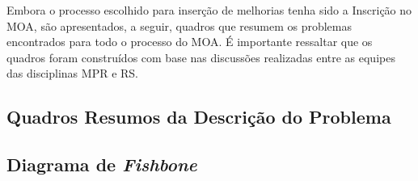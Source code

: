 Embora o processo escolhido para inserção de melhorias tenha sido a Inscrição no MOA, são apresentados, a seguir, quadros que resumem os problemas encontrados para todo o processo do MOA. É importante ressaltar que os quadros foram construídos com base nas discussões realizadas entre as equipes das disciplinas MPR e RS.

\subsection[Quadros Resumos da Descrição do Problema]{Quadros Resumos da Descrição do Problema}
\label{subsec:contexto_problema_quadros}
	

\subsection[Diagrama de \emph{Fishbone}]{Diagrama de \emph{Fishbone}}
	\label{subsec:contexto_problema_fishbone}
		